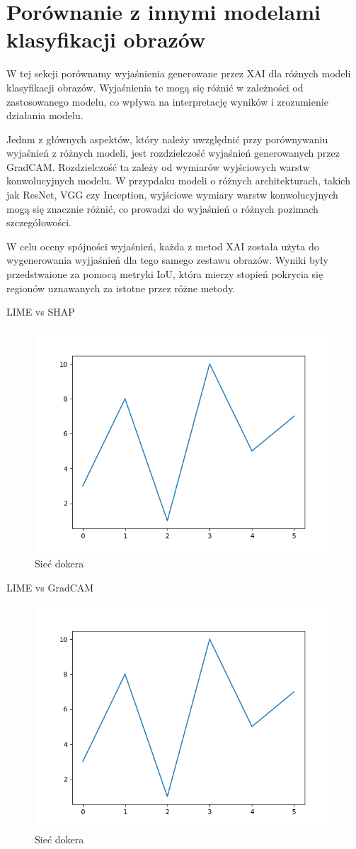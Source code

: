\section*{Porównanie z innymi modelami klasyfikacji obrazów}
W tej sekcji porównamy wyjaśnienia generowane przez XAI dla różnych modeli klasyfikacji obrazów.
Wyjaśnienia te mogą się różnić w zależności od zastosowanego modelu, co wpływa na interpretację wyników i zrozumienie działania modelu.

Jednm z głównych aspektów, który należy uwzględnić przy porównywaniu wyjaśnień z różnych modeli, jest rozdzielczość wyjaśnień generowanych przez GradCAM.
Rozdzielczość ta zależy od wymiarów wyjściowych warstw konwolucyjnych modelu.
W przypdaku modeli o różnych architekturach, takich jak ResNet, VGG czy Inception, wyjściowe wymiary warstw konwolucyjnych mogą się znacznie różnić, co prowadzi do wyjaśnień o różnych pozimach szczegółowości.

W celu oceny spójności wyjaśnień, każda z metod XAI została użyta do wygenerowania wyjjaśnień dla tego samego zestawu obrazów.
Wyniki były przedstwaione za pomocą metryki IoU, która mierzy stopień pokrycia się regionów uznawanych za istotne przez różne metody.

LIME vs SHAP
\begin{figure}
  \centering\includegraphics[width=.6\textwidth]{images/example}
\caption{Sieć dokera \cite{docker_compose_reference}}  \label{rys:network}
\end{figure}

LIME vs GradCAM
\begin{figure}
  \centering\includegraphics[width=.6\textwidth]{images/example}
\caption{Sieć dokera \cite{docker_compose_reference}}  \label{rys:network}
\end{figure}

